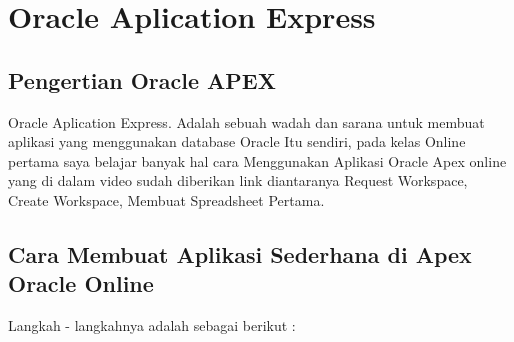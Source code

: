 \chapter{Oracle Aplication Express}


\section{Pengertian Oracle APEX}
Oracle Aplication Express\cite{OracleApex}. Adalah sebuah wadah dan sarana untuk membuat aplikasi yang menggunakan database Oracle Itu sendiri, pada kelas Online pertama saya belajar banyak hal cara Menggunakan Aplikasi Oracle Apex online yang di dalam video sudah diberikan link diantaranya Request Workspace, Create Workspace, Membuat Spreadsheet Pertama.

\section{Cara Membuat Aplikasi Sederhana di Apex Oracle Online}
Langkah - langkahnya adalah sebagai berikut :
